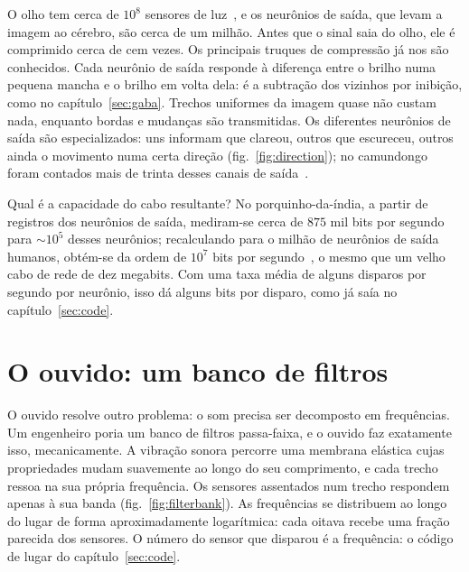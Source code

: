 O olho tem cerca de $10^8$ sensores de luz~\cite{Curcio1990}, e os neurônios de saída, que levam a imagem ao cérebro, são cerca de um milhão. Antes que o sinal saia do olho, ele é comprimido cerca de cem vezes. Os principais truques de compressão já nos são conhecidos. Cada neurônio de saída responde à diferença entre o brilho numa pequena mancha e o brilho em volta dela: é a subtração dos vizinhos por inibição, como no capítulo~\ref{sec:gaba}. Trechos uniformes da imagem quase não custam nada, enquanto bordas e mudanças são transmitidas. Os diferentes neurônios de saída são especializados: uns informam que clareou, outros que escureceu, outros ainda o movimento numa certa direção (fig.~\ref{fig:direction}); no camundongo foram contados mais de trinta desses canais de saída~\cite{Baden2016}.

Qual é a capacidade do cabo resultante? No porquinho-da-índia, a partir de registros dos neurônios de saída, mediram-se cerca de $875$ mil bits por segundo para $\sim10^5$ desses neurônios; recalculando para o milhão de neurônios de saída humanos, obtém-se da ordem de $10^7$ bits por segundo~\cite{Koch2006}, o mesmo que um velho cabo de rede de dez megabits. Com uma taxa média de alguns disparos por segundo por neurônio, isso dá alguns bits por disparo, como já saía no capítulo~\ref{sec:code}.

\section{O ouvido: um banco de filtros}

O ouvido resolve outro problema: o som precisa ser decomposto em frequências. Um engenheiro poria um banco de filtros passa-faixa, e o ouvido faz exatamente isso, mecanicamente. A vibração sonora percorre uma membrana elástica cujas propriedades mudam suavemente ao longo do seu comprimento, e cada trecho ressoa na sua própria frequência. Os sensores assentados num trecho respondem apenas à sua banda (fig.~\ref{fig:filterbank}). As frequências se distribuem ao longo do lugar de forma aproximadamente logarítmica: cada oitava recebe uma fração parecida dos sensores. O número do sensor que disparou é a frequência: o código de lugar do capítulo~\ref{sec:code}.

